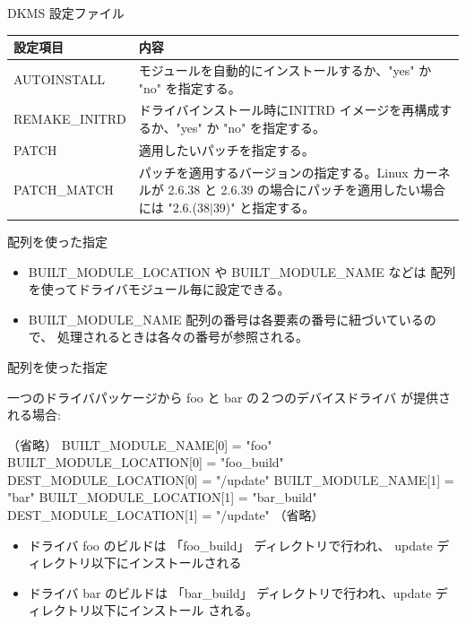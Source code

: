 \begin{frame}{DKMS 設定ファイル}

\begin{center}

  \begin{tabular}{|l|p{}|}
 \hline
 設定項目 & 内容 \\
 \hline \hline
AUTOINSTALL & モジュールを自動的にインストールするか、"yes" か "no" を指定する。\\\hline
REMAKE\_INITRD & ドライバインストール時にINITRD イメージを再構成するか、"yes" か "no" を指定する。 \\\hline
PATCH & 適用したいパッチを指定する。\\\hline
PATCH\_MATCH & パッチを適用するバージョンの指定する。Linux カーネルが 2.6.38 と 2.6.39 の場合にパッチを適用したい場合には "2.6.(38$|$39)" と指定する。\\
 \hline
 \end{tabular}
\end{center}

\end{frame}


\begin{frame}[containsverbatim]{配列を使った指定}

\begin{itemize}
\item BUILT\_MODULE\_LOCATION や BUILT\_MODULE\_NAME などは
配列を使ってドライバモジュール毎に設定できる。
\item BUILT\_MODULE\_NAME 配列の番号は各要素の番号に紐づいているので、
処理されるときは各々の番号が参照される。
\end{itemize}
\end{frame}

\begin{frame}[containsverbatim]{配列を使った指定}

一つのドライバパッケージから foo と bar の２つのデバイスドライバ
が提供される場合:

\begin{commandline}
（省略）
BUILT\_MODULE\_NAME[0] = "foo"
BUILT\_MODULE\_LOCATION[0]  = "foo_build"
DEST\_MODULE\_LOCATION[0] = "/update"
BUILT\_MODULE\_NAME[1] = "bar"
BUILT\_MODULE\_LOCATION[1]  = "bar_build"
DEST\_MODULE\_LOCATION[1] = "/update"
（省略）
\end{commandline}

\begin{itemize}
\item ドライバ foo のビルドは 「foo\_build」 ディレクトリで行われ、
update ディレクトリ以下にインストールされる
\item ドライバ bar のビルドは
「bar\_build」 ディレクトリで行われ、update ディレクトリ以下にインストール
される。
\end{itemize}

\end{frame}

